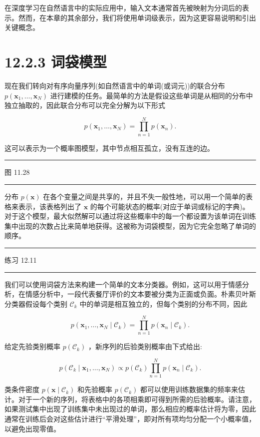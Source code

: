 \documentclass[10pt]{article}
\newcommand{\HRule}{\begin{center}\rule{0.9\linewidth}{0.2mm}\end{center}}
\begin{document}
在深度学习在自然语言中的实际应用中，输入文本通常首先被映射为分词后的表示。然而，在本章的其余部分，我们将使用单词级表示，因为这更容易说明和引出关键概念。

\section*{12.2.3 词袋模型}

现在我们转向对有序向量序列(如自然语言中的单词(或词元))的联合分布 \(p\left( {{\mathbf{x}}_{1},\ldots ,{\mathbf{x}}_{N}}\right)\) 进行建模的任务。最简单的方法是假设这些单词是从相同的分布中独立抽取的，因此联合分布可以完全分解为以下形式

\[
p\left( {{\mathbf{x}}_{1},\ldots ,{\mathbf{x}}_{N}}\right)  = \mathop{\prod }\limits_{{n = 1}}^{N}p\left( {\mathbf{x}}_{n}\right) . \tag{12.28}
\]

这可以表示为一个概率图模型，其中节点相互孤立，没有互连的边。

\HRule

图 11.28

\HRule

分布 \(p\left( \mathbf{x}\right)\) 在各个变量之间是共享的，并且不失一般性地，可以用一个简单的表格来表示，该表格列出了 \(\mathbf{x}\) 的每个可能状态的概率(对应于单词或标记的字典)。对于这个模型，最大似然解可以通过将这些概率中的每一个都设置为该单词在训练集中出现的次数占比来简单地获得。这被称为词袋模型，因为它完全忽略了单词的顺序。

\HRule

练习 12.11

\HRule

我们可以使用词袋方法来构建一个简单的文本分类器。例如，这可以用于情感分析，在情感分析中，一段代表餐厅评价的文本要被分类为正面或负面。朴素贝叶斯分类器假设每个类别 \({\mathcal{C}}_{k}\) 中的单词是相互独立的，但每个类别的分布不同，因此

\[
p\left( {{\mathbf{x}}_{1},\ldots ,{\mathbf{x}}_{N} \mid  {\mathcal{C}}_{k}}\right)  = \mathop{\prod }\limits_{{n = 1}}^{N}p\left( {{\mathbf{x}}_{n} \mid  {\mathcal{C}}_{k}}\right) . \tag{12.29}
\]

给定先验类别概率 \(p\left( {\mathcal{C}}_{k}\right)\) ，新序列的后验类别概率由下式给出:

\[
p\left( {{\mathcal{C}}_{k} \mid  {\mathbf{x}}_{1},\ldots ,{\mathbf{x}}_{N}}\right)  \propto  p\left( {\mathcal{C}}_{k}\right) \mathop{\prod }\limits_{{n = 1}}^{N}p\left( {{\mathbf{x}}_{n} \mid  {\mathcal{C}}_{k}}\right) . \tag{12.30}
\]

类条件密度 \(p\left( {\mathbf{x} \mid  {\mathcal{C}}_{k}}\right)\) 和先验概率 \(p\left( {\mathcal{C}}_{k}\right)\) 都可以使用训练数据集的频率来估计。对于一个新的序列，将表格中的各项相乘即可得到所需的后验概率。请注意，如果测试集中出现了训练集中未出现过的单词，那么相应的概率估计将为零，因此通常在训练后会对这些估计进行“平滑处理”，即对所有项均匀分配一个小概率值，以避免出现零值。
\end{document}
